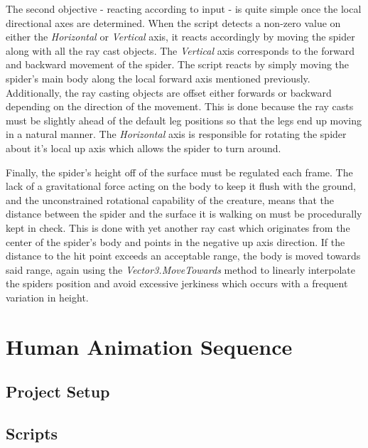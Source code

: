 The second objective - reacting according to input - is quite simple once the
local directional axes are determined. When the script detects a non-zero value
on either the \textit{Horizontal} or \textit{Vertical} axis, it reacts
accordingly by moving the spider along with all the ray cast objects. The
\textit{Vertical} axis corresponds to the forward and backward movement of the
spider. The script reacts by simply moving the spider's main body along the
local forward axis mentioned previously. Additionally, the ray casting objects
are offset either forwards or backward depending on the direction of the
movement. This is done because the ray casts must be slightly ahead of the
default leg positions so that the legs end up moving in a natural manner.
The \textit{Horizontal} axis is responsible for rotating the spider about it's
local up axis which allows the spider to turn around. 

Finally, the spider's height off of the surface must be regulated each frame.
The lack of a gravitational force acting on the body to keep it flush with the
ground, and the unconstrained rotational capability of the creature, means that
the distance between the spider and the surface it is walking on must be
procedurally kept in check. This is done with yet another ray cast which
originates from the center of the spider's body and points in the negative up
axis direction. If the distance to the hit point exceeds an acceptable range,
the body is moved towards said range, again using the
\textit{Vector3.MoveTowards} method to linearly interpolate the spiders position
and avoid excessive jerkiness which occurs with a frequent variation in height. 



\section{Human Animation Sequence}
\subsection{Project Setup}
\subsection{Scripts}
